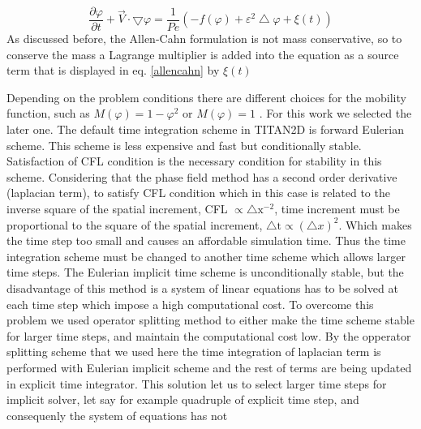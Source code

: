 \documentclass[letterpaper,10pt]{article}
\begin{document}
\begin{equation} 
\label{allencahn}
\frac{\partial \varphi }{\partial t} + \overrightarrow{V} \cdot \bigtriangledown \varphi = 
\frac{1}{Pe}(-f(\varphi)+\varepsilon^2\bigtriangleup\varphi+\xi(t))
\end{equation}
As discussed before, the Allen-Cahn formulation is not mass conservative, so to conserve the mass a Lagrange multiplier is added into 
the equation as a source term that is displayed in eq. \eqref{allencahn} by $\xi(t)$

% 

Depending on the problem conditions there are different choices for the mobility function, such 
as $M(\varphi)=1-\varphi^2$ or $M(\varphi)=1$ \cite{}. For this work we selected the later one.\newline
The default time integration scheme in TITAN2D is forward Eulerian scheme. This scheme is less expensive and fast but conditionally 
stable. Satisfaction of CFL condition is the necessary condition for stability in this scheme. Considering that the phase field 
method has a second order derivative (laplacian term), to satisfy CFL condition which in this case is related to the inverse
square of the spatial increment, CFL $\propto \bigtriangleup \text{x}^{-2}$, time increment must be proportional to the square 
of the spatial increment, $\bigtriangleup \text{t} \propto ( \bigtriangleup x)^2 $. Which makes the time step too small and causes 
an affordable simulation time.
Thus the time integration scheme must be changed to another time scheme which allows larger time steps.
The Eulerian implicit time scheme is unconditionally stable, but the disadvantage of this method is 
a system of linear equations has to be solved at each time step which impose a high computational cost.
To overcome this problem we used operator splitting method to either make the time scheme stable for larger time steps,  
and maintain the computational cost low.  
By the opperator splitting scheme that we used here the time integration of laplacian term is performed with Eulerian implicit 
scheme and the rest of terms are being updated in explicit time integrator. This solution let us to select larger time steps 
for implicit solver, let say for example quadruple of explicit time step, and consequenly the system of equations has not 
\end{document}
